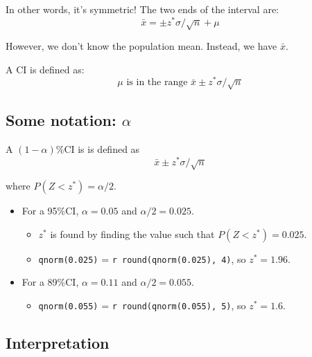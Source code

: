 \documentclass[
  letterpaper,
  DIV=11,
  numbers=noendperiod]{scrreprt}
\providecommand{\tightlist}{%
  \setlength{\itemsep}{0pt}\setlength{\parskip}{0pt}}\usepackage{longtable,booktabs,array}
\begin{document}
In other words, it's symmetric! The two ends of the interval are: \[
\bar x = \pm z^*\sigma/\sqrt{n} + \mu
\]

However, we don't know the population mean. Instead, we have \(\bar x\).

A CI is defined as: \[
\mu \text{ is in the range } \bar x \pm z^*\sigma/\sqrt{n}
\]

\hypertarget{some-notation-alpha}{%
\subsection{\texorpdfstring{Some notation:
\(\alpha\)}{Some notation: \textbackslash alpha}}\label{some-notation-alpha}}

A \((1-\alpha)\%\)CI is is defined as \[
\bar x \pm z^*\sigma/\sqrt{n}
\]

where \(P(Z < z^*) = \alpha/2\).\newline

\begin{itemize}
\tightlist
\item
  For a 95\%CI, \(\alpha = 0.05\) and \(\alpha/2= 0.025\).

  \begin{itemize}
  \tightlist
  \item
    \(z^*\) is found by finding the value such that
    \(P(Z <z^*) = 0.025\).
  \item
    \texttt{qnorm(0.025)} = \texttt{r\ round(qnorm(0.025),\ 4)}, so
    \(z^* = 1.96\).
  \end{itemize}
\item
  For a 89\%CI, \(\alpha = 0.11\) and \(\alpha/2 = 0.055\).

  \begin{itemize}
  \tightlist
  \item
    \texttt{qnorm(0.055)} = \texttt{r\ round(qnorm(0.055),\ 5)}, so
    \(z^* = 1.6\).
  \end{itemize}
\end{itemize}

\hypertarget{interpretation}{%
\subsection{Interpretation}\label{interpretation}}
\end{document}
